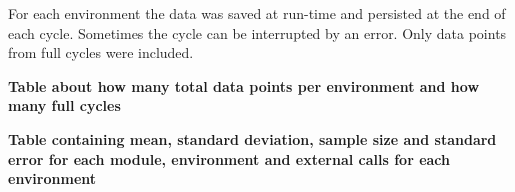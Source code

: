 For each environment the data was saved at run-time and persisted at the end of each cycle.
Sometimes the cycle can be interrupted by an error.
Only data points from full cycles were included.

\textbf{Table about how many total data points per environment and how many full cycles}

\textbf{Table containing mean, standard deviation, sample size and standard error for each module, environment and external calls for each environment}












